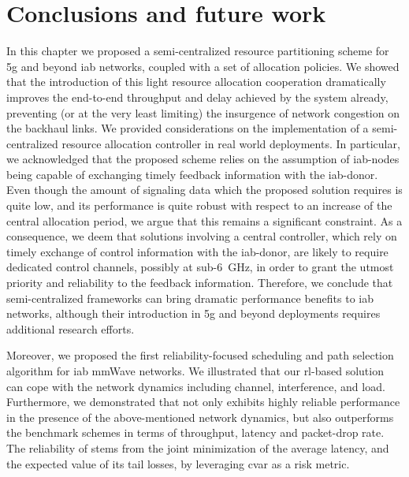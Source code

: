 \section{Conclusions and future work}
\label{sec:concl-iab}


In this chapter we proposed a semi-centralized resource partitioning scheme for \gls{5g} and beyond \gls{iab} networks, coupled with a set of allocation policies. We showed that the introduction of this light resource allocation cooperation dramatically improves the end-to-end throughput and delay achieved by the system already, preventing (or at the very least limiting) the insurgence of network congestion on the backhaul links. %
We provided considerations on the implementation of a semi-centralized resource allocation controller in real world deployments. In particular, we acknowledged that the proposed scheme relies on the assumption of \gls{iab}-nodes being capable of exchanging timely feedback information with the \gls{iab}-donor. Even though the amount of signaling data which the proposed solution requires is quite low, and its performance is quite robust with respect to an increase of the central allocation period, we argue that this remains a significant constraint. 
As a consequence, we deem that solutions involving a central controller, which rely on timely exchange of control information with the \gls{iab}-donor, are likely to require dedicated control channels, possibly at sub-6~{GHz}, in order to grant the utmost priority and reliability to the feedback information. 
Therefore, we conclude that semi-centralized frameworks can bring dramatic performance benefits to \gls{iab} networks, although their introduction in \gls{5g} and beyond deployments requires additional research efforts.

Moreover, we proposed the first reliability-focused scheduling and path selection algorithm for \gls{iab} mmWave networks. We illustrated that our \gls{rl}-based solution can cope with the network dynamics including channel, interference, and load. Furthermore, we demonstrated that \name{} not only  exhibits highly reliable performance in the presence of the above-mentioned network dynamics, but also outperforms the benchmark schemes in terms of throughput, latency and packet-drop rate. The reliability of \name{} stems from the joint minimization of the average latency, and the expected value of its tail losses, by leveraging \gls{cvar} as a risk metric.

